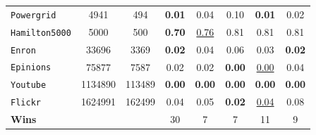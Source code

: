 \documentclass{article}
\begin{document}
\begin{table}[h]
\begin{minipage}{0.49\linewidth}
{\begin{tabular}{l|c|c|c|c|c|c|c}
            \texttt{Powergrid} & 4941 & 494 & \textbf{0.01} & 0.04 & 0.10 & \textbf{0.01} & 0.02 \\
            \texttt{Hamilton5000} & 5000 & 500 & \textbf{0.70} & \underline{0.76} & 0.81 & 0.81 & 0.81 \\
            \texttt{Enron} & 33696 & 3369 & \textbf{0.02} & 0.04 & 0.06 & 0.03 & \textbf{0.02} \\
            \texttt{Epinions} & 75877 & 7587 & 0.02 & 0.02 & \textbf{0.00} & \underline{0.00} & 0.04 \\
            \texttt{Youtube} & 1134890 & 113489 & \textbf{0.00} & \textbf{0.00} & \textbf{0.00} & \textbf{0.00} & \textbf{0.00} \\
            \texttt{Flickr} & 1624991 & 162499 & 0.04 & 0.05 & \textbf{0.02} & \underline{0.04} & 0.08 \\
            \hline
            \textbf{Wins} & & & 30 & 7 & 7 & 11 & 9 \\
            \end{tabular}
        }
    \end{minipage}
    \end{table}
\end{document}
